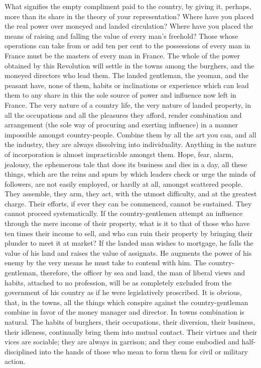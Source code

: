 What signifies the empty compliment paid to the country, by giving it, perhaps, more than its share in the theory of your representation? Where have you placed the real power over moneyed and landed circulation? Where have you placed the means of raising and falling the value of every man's freehold? Those whose operations can take from or add ten per cent to the possessions of every man in France must be the masters of every man in France. The whole of the power obtained by this Revolution will settle in the towns among the burghers, and the moneyed directors who lead them. The landed gentleman, the yeoman, and the peasant have, none of them, habits or inclinations or experience which can lead them to any share in this the sole source of power and influence now left in France. The very nature of a country life, the very nature of landed property, in all the occupations and all the pleasures they afford, render combination and arrangement (the sole way of procuring and exerting influence) in a manner impossible amongst country-people. Combine them by all the art you can, and all the industry, they are always dissolving into individuality. Anything in the nature of incorporation is almost impracticable amongst them. Hope, fear, alarm, jealousy, the ephemerous tale that does its business and dies in a day, all these things, which are the reins and spurs by which leaders check or urge the minds of followers, are not easily employed, or hardly at all, amongst scattered people. They assemble, they arm, they act, with the utmost difficulty, and at the greatest charge. Their efforts, if ever they can be commenced, cannot be sustained. They cannot proceed systematically. If the country-gentlemen attempt an influence through the mere income of their property, what is it to that of those who have ten times their income to sell, and who can ruin their property by bringing their plunder to meet it at market? If the landed man wishes to mortgage, he falls the value of his land and raises the value of assignats. He augments the power of his enemy by the very means he must take to contend with him. The country-gentleman, therefore, the officer by sea and land, the man of liberal views and habits, attached to no profession, will be as completely excluded from the government of his country as if he were legislatively proscribed. It is obvious, that, in the towns, all the things which conspire against the country-gentleman combine in favor of the money manager and director. In towns combination is natural. The habits of burghers, their occupations, their diversion, their business, their idleness, continually bring them into mutual contact. Their virtues and their vices are sociable; they are always in garrison; and they come embodied and half-disciplined into the hands of those who mean to form them for civil or military action.

